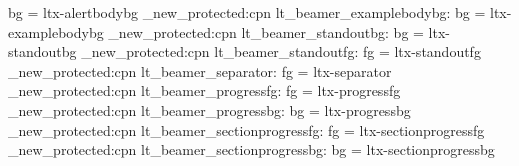   {  { bg = ltx-alertbodybg } }
\cs_new_protected:cpn { lt_beamer_examplebodybg: }
  {  { bg = ltx-examplebodybg } }
\cs_new_protected:cpn { lt_beamer_standoutbg: }
  {  { bg = ltx-standoutbg } }
\cs_new_protected:cpn { lt_beamer_standoutfg: }
  {  { fg = ltx-standoutfg } }
\cs_new_protected:cpn { lt_beamer_separator: }
  {  { fg = ltx-separator } }
\cs_new_protected:cpn { lt_beamer_progressfg: }
  {  { fg = ltx-progressfg } }
\cs_new_protected:cpn { lt_beamer_progressbg: }
  {  { bg = ltx-progressbg } }
\cs_new_protected:cpn { lt_beamer_sectionprogressfg: }
  {  { fg = ltx-sectionprogressfg } }
\cs_new_protected:cpn { lt_beamer_sectionprogressbg: }
  {  { bg = ltx-sectionprogressbg } }
